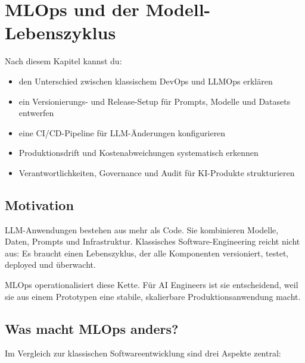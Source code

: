\chapter{MLOps und der Modell-Lebenszyklus}

\label{chap:mlops_modelllebenszyklus}

\begin{lernziele}
Nach diesem Kapitel kannst du:
\begin{itemize}
    \item den Unterschied zwischen klassischem DevOps und LLMOps erklären
    \item ein Versionierungs- und Release-Setup für Prompts, Modelle und Datasets entwerfen
    \item eine CI/CD-Pipeline für LLM-Änderungen konfigurieren
    \item Produktionsdrift und Kostenabweichungen systematisch erkennen
    \item Verantwortlichkeiten, Governance und Audit für KI-Produkte strukturieren
\end{itemize}
\end{lernziele}

\section{Motivation}

LLM-Anwendungen bestehen aus mehr als Code. Sie kombinieren Modelle, Daten, Prompts und Infrastruktur. Klassisches Software-Engineering reicht nicht aus: Es braucht einen Lebenszyklus, der alle Komponenten versioniert, testet, deployed und überwacht.

MLOps operationalisiert diese Kette. Für AI Engineers ist sie entscheidend, weil sie aus einem Prototypen eine stabile, skalierbare Produktionsanwendung macht.

\section{Was macht MLOps anders?}

Im Vergleich zur klassischen Softwareentwicklung sind drei Aspekte zentral:

